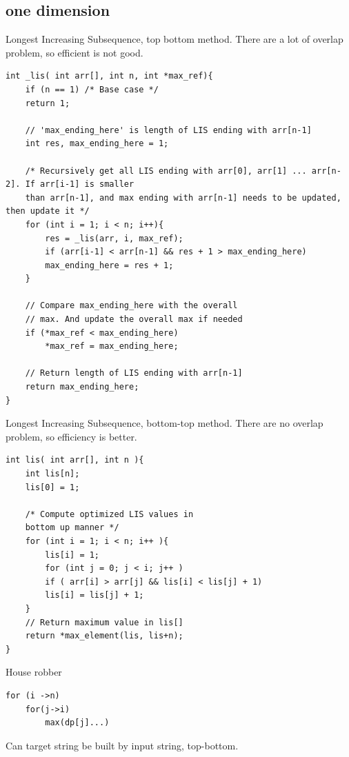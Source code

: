 \documentclass[a4paper,11pt,twoside]{book}
\begin{document}
\subsection{one dimension}
	
	\par Longest Increasing Subsequence, top bottom method. There are a lot of overlap problem, so efficient is not good.
	
\begin{lstlisting}[numbers=none]
int _lis( int arr[], int n, int *max_ref){
	if (n == 1) /* Base case */
	return 1;
	
	// 'max_ending_here' is length of LIS ending with arr[n-1]
	int res, max_ending_here = 1;
	
	/* Recursively get all LIS ending with arr[0], arr[1] ... arr[n-2]. If arr[i-1] is smaller
	than arr[n-1], and max ending with arr[n-1] needs to be updated, then update it */
	for (int i = 1; i < n; i++){
		res = _lis(arr, i, max_ref);
		if (arr[i-1] < arr[n-1] && res + 1 > max_ending_here)
		max_ending_here = res + 1;
	}
	
	// Compare max_ending_here with the overall
	// max. And update the overall max if needed
	if (*max_ref < max_ending_here)
		*max_ref = max_ending_here;
	
	// Return length of LIS ending with arr[n-1]
	return max_ending_here;
}	
\end{lstlisting}	
	
	\par Longest Increasing Subsequence, bottom-top method. There are no overlap problem, so efficiency is better.
	
\begin{lstlisting}[numbers=none]
int lis( int arr[], int n ){
	int lis[n];
	lis[0] = 1;  
	
	/* Compute optimized LIS values in
	bottom up manner */
	for (int i = 1; i < n; i++ ){
		lis[i] = 1;
		for (int j = 0; j < i; j++ ) 
		if ( arr[i] > arr[j] && lis[i] < lis[j] + 1)
		lis[i] = lis[j] + 1;
	}
	// Return maximum value in lis[]
	return *max_element(lis, lis+n);
}	
\end{lstlisting}	
	
	
	\par House robber
\begin{lstlisting}[numbers=none]
for (i ->n)
	for(j->i)
		max(dp[j]...)
\end{lstlisting}	
	
	
	\par Can target string be built by input string, top-bottom.
	
\end{document}
